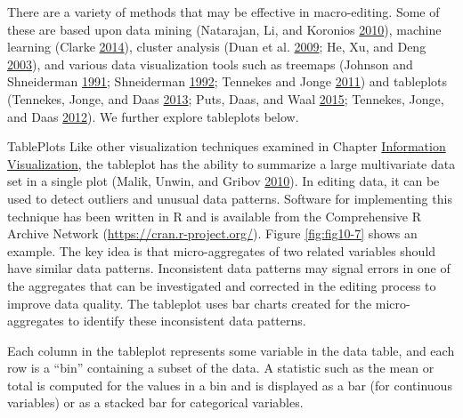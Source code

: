 \documentclass[]{krantz}
\begin{document}
There are a variety of methods that may be effective in macro-editing.
Some of these are based upon data mining (Natarajan, Li, and Koronios
\protect\hyperlink{ref-natarajan2010data}{2010}), machine learning
(Clarke \protect\hyperlink{ref-Clarke2014}{2014}), cluster analysis
(Duan et al. \protect\hyperlink{ref-duan2009cluster}{2009}; He, Xu, and
Deng \protect\hyperlink{ref-he2003discovering}{2003}), and various data
visualization tools such as treemaps (Johnson and Shneiderman
\protect\hyperlink{ref-johnson1991tree}{1991}; Shneiderman
\protect\hyperlink{ref-shneiderman1992tree}{1992}; Tennekes and Jonge
\protect\hyperlink{ref-tennekes2011top}{2011}) and tableplots (Tennekes,
Jonge, and Daas \protect\hyperlink{ref-tennekes2013visualizing}{2013};
Puts, Daas, and Waal \protect\hyperlink{ref-puts2015finding}{2015};
Tennekes, Jonge, and Daas \protect\hyperlink{ref-Tennekes2012}{2012}).
We further explore tableplots below.

TablePlots Like other visualization techniques examined in Chapter
\protect\hyperlink{chap:viz}{Information Visualization}, the tableplot
has the ability to summarize a large multivariate data set in a single
plot (Malik, Unwin, and Gribov
\protect\hyperlink{ref-malik2010interactive}{2010}). In editing data, it
can be used to detect outliers and unusual data patterns. Software for
implementing this technique has been written in R and is available from
the Comprehensive R Archive Network (\url{https://cran.r-project.org/}).
Figure \ref{fig:fig10-7} shows an example. The key idea is that
micro-aggregates of two related variables should have similar data
patterns. Inconsistent data patterns may signal errors in one of the
aggregates that can be investigated and corrected in the editing process
to improve data quality. The tableplot uses bar charts created for the
micro-aggregates to identify these inconsistent data patterns.

Each column in the tableplot represents some variable in the data table,
and each row is a ``bin'' containing a subset of the data. A statistic
such as the mean or total is computed for the values in a bin and is
displayed as a bar (for continuous variables) or as a stacked bar for
categorical variables.
\end{document}
